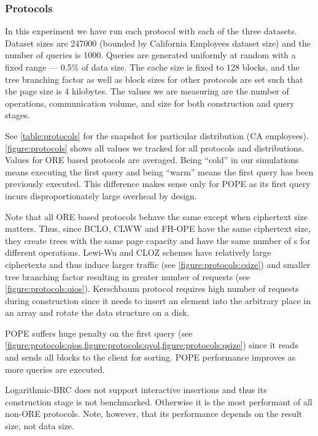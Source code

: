 		\subsubsection{Protocols}\label{section:range-snapshot:results-protocols}

			In this experiment we have run each protocol with each of the three datasets.
			Dataset sizes are 247000 (bounded by California Employees dataset size) and the number of queries is 1000.
			Queries are generated uniformly at random with a fixed range --- 0.5\% of data size.
			The cache size is fixed to 128 blocks, and the {\BPlus} tree branching factor as well as block sizes for other protocols are set such that the page size is 4 kilobytes.
			The values we are measuring are the number of {\IO} operations, communication volume, and size for both construction and query stages.

			See \cref{table:protocols} for the snapshot for particular distribution (CA employees).
			\cref{figure:protocols} shows all values we tracked for all protocols and distributions.
			Values for ORE based protocols are averaged.
			Being ``cold'' in our simulations means executing the first query and being ``warm'' means the first query has been previously executed.
			This difference makes sense only for POPE as its first query incurs disproportionately large overhead by design.

			Note that all ORE based protocols behave the same except when ciphertext size matters.
			Thus, since BCLO, CLWW and FH-OPE have the same ciphertext size, they create {\BPlus} trees with the same page capacity and have the same number of {\IO}s for different operations.
			Lewi-Wu and CLOZ schemes have relatively large ciphertexts and thus induce larger traffic (see \cref{figure:protocols:csize}) and smaller {\BPlus} tree branching factor resulting in greater number of {\IO} requests (see \cref{figure:protocols:qios}).
			Kerschbaum protocol requires high number of {\IO} requests during construction since it needs to insert an element into the arbitrary place in an array and rotate the data structure on a disk.

			POPE suffers huge penalty on the first query (see \cref{figure:protocols:qios,figure:protocols:qvol,figure:protocols:qsize}) since it reads and sends all blocks to the client for sorting.
			POPE performance improves as more queries are executed.

			Logarithmic\hyp{}BRC does not support interactive insertions and thus its construction stage is not benchmarked.
			Otherwise it is the most performant of all non-ORE protocols.
			Note, however, that its performance depends on the result size, not data size.

